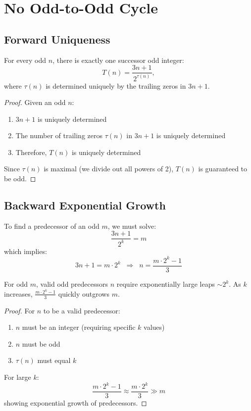 \section{No Odd-to-Odd Cycle}\label{sec:no_odd_cycle}

\subsection{Forward Uniqueness}

\begin{lemma}\label{lemma:forward-uniqueness}
For every odd $n$, there is exactly one successor odd integer:
\[
T(n) = \frac{3n + 1}{2^{\tau(n)}},
\]
where $\tau(n)$ is determined uniquely by the trailing zeros in $3n+1$.
\end{lemma}

\begin{proof}
Given an odd $n$:
\begin{enumerate}
\item $3n + 1$ is uniquely determined
\item The number of trailing zeros $\tau(n)$ in $3n + 1$ is uniquely determined
\item Therefore, $T(n)$ is uniquely determined
\end{enumerate}
Since $\tau(n)$ is maximal (we divide out all powers of 2), $T(n)$ is guaranteed to be odd.
\end{proof}

\subsection{Backward Exponential Growth}

To find a predecessor of an odd $m$, we must solve:
\[
\frac{3n + 1}{2^k} = m
\]
which implies:
\[
3n + 1 = m\cdot 2^k \;\;\Rightarrow\;\; n = \frac{m\cdot 2^k - 1}{3}
\]

\begin{lemma}\label{lemma:backward-growth}
For odd $m$, valid odd predecessors $n$ require exponentially large leaps $\sim 2^k$. As $k$ increases, $\frac{m\cdot 2^k - 1}{3}$ quickly outgrows $m$.
\end{lemma}

\begin{proof}
For $n$ to be a valid predecessor:
\begin{enumerate}
\item $n$ must be an integer (requiring specific $k$ values)
\item $n$ must be odd
\item $\tau(n)$ must equal $k$
\end{enumerate}

For large $k$:
\[
\frac{m\cdot 2^k - 1}{3} \approx \frac{m\cdot 2^k}{3} \gg m
\]
showing exponential growth of predecessors.
\end{proof}

